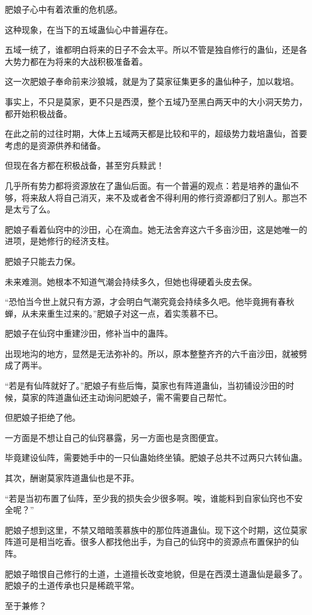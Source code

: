 \begin{this_body}
肥娘子心中有着浓重的危机感。

这种现象，在当下的五域蛊仙心中普遍存在。

五域一统了，谁都明白将来的日子不会太平。所以不管是独自修行的蛊仙，还是各大势力都在为将来的大战积极准备着。

这一次肥娘子奉命前来沙狼城，就是为了莫家征集更多的蛊仙种子，加以栽培。

事实上，不只是莫家，更不只是西漠，整个五域乃至黑白两天中的大小洞天势力，都开始积极战备。

在此之前的过往时期，大体上五域两天都是比较和平的，超级势力栽培蛊仙，首要考虑的是资源供养和储备。

但现在各方都在积极战备，甚至穷兵黩武！

几乎所有势力都将资源放在了蛊仙后面。有一个普遍的观点：若是培养的蛊仙不够，将来敌人将自己消灭，来不及或者舍不得利用的修行资源都归了别人。那岂不是太亏了么。

肥娘子看着仙窍中的沙田，心在滴血。她无法舍弃这六千多亩沙田，这是她唯一的进项，是她修行的经济支柱。

肥娘子只能去力保。

未来难测。她根本不知道气潮会持续多久，但她也得硬着头皮去保。

“恐怕当今世上就只有方源，才会明白气潮究竟会持续多久吧。他毕竟拥有春秋蝉，从未来重生过来的。”肥娘子对这一点，着实羡慕不已。

肥娘子在仙窍中重建沙田，修补当中的蛊阵。

出现地沟的地方，显然是无法弥补的。所以，原本整整齐齐的六千亩沙田，就被劈成了两半。

“若是有仙阵就好了。”肥娘子有些后悔，莫家也有阵道蛊仙，当初铺设沙田的时候，莫家的阵道蛊仙还主动询问肥娘子，需不需要自己帮忙。

但肥娘子拒绝了他。

一方面是不想让自己的仙窍暴露，另一方面也是贪图便宜。

毕竟建设仙阵，需要她手中的一只仙蛊始终坐镇。肥娘子总共不过两只六转仙蛊。

其次，酬谢莫家阵道蛊仙也是不菲。

“若是当初布置了仙阵，至少我的损失会少很多啊。唉，谁能料到自家仙窍也不安全呢？”

肥娘子想到这里，不禁又暗暗羡慕族中的那位阵道蛊仙。现下这个时期，这位莫家阵道可是相当吃香。很多人都找他出手，为自己的仙窍中的资源点布置保护的仙阵。

肥娘子暗恨自己修行的土道，土道擅长改变地貌，但是在西漠土道蛊仙是最多了。肥娘子的土道传承也只是稀疏平常。

至于兼修？


\end{this_body}

